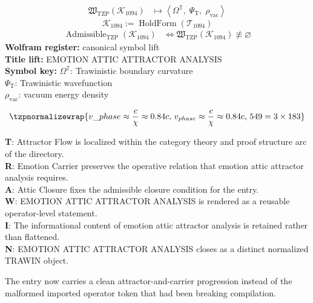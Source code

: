 \noindent
\begin{minipage}[t]{0.48\linewidth}
\begingroup
\small
\[
\begin{aligned}
\mathfrak{W}_{\mathrm{TZP}}\!\left(\mathcal{K}_{1094}\right)
&\longmapsto
\left\langle \Omega^{\mathbb{T}},\; \Psi_{\mathrm{T}},\; \rho_{\mathrm{vac}} \right\rangle
\end{aligned}
\]
\[
\mathcal{K}_{1094}
:=
\operatorname{HoldForm}\!\left(\mathcal{T}_{1094}\right)
\]
\[
\begin{aligned}
\operatorname{Admissible}_{\mathrm{TZP}}\!\left(\mathcal{K}_{1094}\right)
&\Longleftrightarrow
\mathfrak{W}_{\mathrm{TZP}}\!\left(\mathcal{K}_{1094}\right)\not\equiv\varnothing
\end{aligned}
\]
\textbf{Wolfram register:} canonical symbol lift\\
\textbf{Title lift:} EMOTION ATTIC ATTRACTOR ANALYSIS\\
\textbf{Symbol key:} \(\Omega^{\mathbb{T}}\): Trawinistic boundary curvature\\ \(\Psi_{\mathrm{T}}\): Trawinistic wavefunction\\ \(\rho_{\mathrm{vac}}\): vacuum energy density
\par
\endgroup
\end{minipage}\hfill
\begin{minipage}[t]{0.48\linewidth}
\[
\tzpnormalizewrap{v\_{phase} \approx \frac{c}{\chi} \approx 0.84c,\,v_{phase} \approx \frac{c}{\chi} \approx 0.84c,\,549=3\times183}
\]

\small
\textbf{T}: Attractor Flow is localized within the category theory and proof structure arc of the directory.\\
\textbf{R}: Emotion Carrier preserves the operative relation that emotion attic attractor analysis requires.\\
\textbf{A}: Attic Closure fixes the admissible closure condition for the entry.\\
\textbf{W}: EMOTION ATTIC ATTRACTOR ANALYSIS is rendered as a reusable operator-level statement.\\
\textbf{I}: The informational content of emotion attic attractor analysis is retained rather than flattened.\\
\textbf{N}: EMOTION ATTIC ATTRACTOR ANALYSIS closes as a distinct normalized TRAWIN object.
\normalsize
\end{minipage}

The entry now carries a clean attractor-and-carrier progression instead of the malformed imported operator token that had been breaking compilation.
\clearpage

